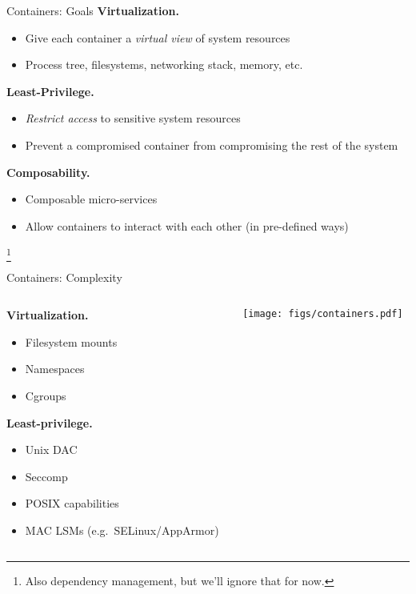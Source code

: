 \documentclass[12pt, dvipsnames, aspectratio=169]{beamer}
\newcommand{\blue}[1]{{\color{blue}#1}}
\newcommand{\orange}[1]{{\color{orange}#1}}
\newcommand{\green}[1]{{\color{green}#1}}
\newcommand\ufootnote[1]{%
    \begingroup
        \renewcommand\thefootnote{}\footnote{\hspace{-1.8em}#1}%
        \addtocounter{footnote}{-1}%
    \endgroup
}
\begin{document}
\begin{frame}[c]{Containers: Goals}
\textbf{\orange{Virtualization.}}
\begin{itemize}
  \item Give each container a \textit{virtual view} of system resources
  \item Process tree, filesystems, networking stack, memory, etc.
\end{itemize}
\vfill
\textbf{\blue{Least-Privilege.}}
\begin{itemize}
  \item \textit{Restrict access} to sensitive system resources
  \item Prevent a compromised container from compromising the rest of the system
\end{itemize}
\vfill
\textbf{\green{Composability.}}
\begin{itemize}
  \item Composable micro-services
  \item Allow containers to interact with each other (in pre-defined ways)
\end{itemize}
\ufootnote{Also dependency management, but we'll ignore that for now.}
\end{frame}

\begin{frame}[c]{Containers: Complexity}
\begin{columns}
  \begin{column}{0.5\textwidth}
    \orange{\bfseries Virtualization.}
    \begin{itemize}
      \item Filesystem mounts
      \item Namespaces
      \item Cgroups
    \end{itemize}
    \vspace{1.5em}
    \blue{\bfseries Least-privilege.}
    \begin{itemize}
      \item Unix DAC
      \item Seccomp
      \item POSIX capabilities
      \item MAC LSMs (e.g.~SELinux/AppArmor)
    \end{itemize}
  \end{column}
  \begin{column}{0.5\textwidth}
    \begin{center}
      \color{black}
      \texttt{[image: figs/containers.pdf]}
    \end{center}
  \end{column}
\end{columns}
\end{frame}
\end{document}
